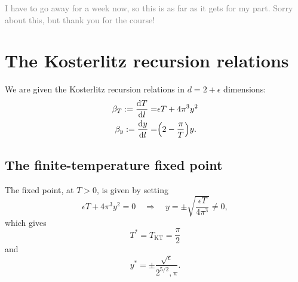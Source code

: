 \documentclass[11pt,letter, swedish, english
]{article}
\begin{document}
\textcolor{gray}{
I have to go away for a week now, so this is as far as it gets for my
part. Sorry about this, but thank you for the course!
}

\section{The Kosterlitz recursion relations}
\newcommand{\TKT}{T_{\text{KT}}}

We are given the Kosterlitz recursion relations in $d=2+\epsilon$
dimensions:
\begin{align}
\label{eq:2_dT/dl}
\beta_T := \dv{T}{l} =& \epsilon T +4\pi^3y^2\\
\label{eq:2_dy/dl}
\beta_y := \dv{y}{l} =& \qty(2 -\frac{\pi}{T})y.
\end{align}


\subsection{The finite-temperature fixed point}
The fixed point, at $T>0$, is given by setting
\begin{equation}
\epsilon T +4\pi^3y^2 = 0
\quad\Longrightarrow\quad
y = \pm\sqrt{\frac{\epsilon T}{4\pi^3}} \neq0,
\end{equation}
which gives
\begin{equation}
T^* = \TKT = \frac{\pi}{2}
\end{equation}
and 
\begin{equation}
y^* = \pm\frac{\sqrt{\epsilon}}{2^{5/2},\pi}.
\end{equation}
\end{document}
